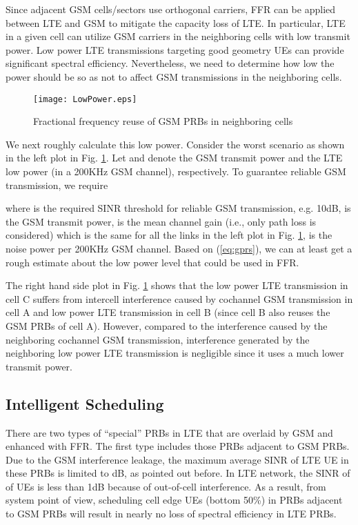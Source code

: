 \documentclass[10pt,journal]{IEEEtran}
\theoremstyle{slplain}
\begin{document}
Since adjacent GSM cells/sectors use orthogonal carriers, FFR can be applied between LTE and GSM to mitigate the capacity loss of LTE. In particular, LTE in a given cell can utilize  GSM carriers in the neighboring cells with low transmit power. Low power LTE transmissions targeting good geometry UEs can provide significant spectral efficiency. Nevertheless, we need to determine how low the power should be so as not to affect  GSM transmissions in the neighboring cells.


\begin{figure}
\centering
\texttt{[image: LowPower.eps]}
\caption{Fractional frequency reuse of GSM PRBs in neighboring cells}
\label{fig:lowPower}
\end{figure}
We next roughly calculate this low power. Consider the worst scenario as shown in the left plot in Fig. \ref{fig:lowPower}. Let  and  denote the GSM transmit power and the LTE low power (in a 200KHz GSM channel),
respectively. To guarantee reliable GSM transmission, we require

where  is the required SINR threshold for reliable GSM transmission, e.g. 10dB,  is the GSM transmit power,  is the mean channel gain (i.e., only path loss is considered) which is the same for all the  links in the left plot in Fig. \ref{fig:lowPower},  is the noise power per 200KHz GSM channel.
Based on (\ref{eq:gprs}), we can at least get a rough estimate about the low power level that could be used in FFR.

The right hand side plot in Fig. \ref{fig:lowPower} shows that the low power LTE transmission in cell C suffers from intercell interference caused by cochannel GSM transmission in cell A and low power LTE transmission in cell B (since cell B also reuses the GSM PRBs of cell A).
However, compared to the interference caused by the neighboring cochannel GSM transmission, interference generated by the neighboring low power LTE transmission is negligible since it uses a much lower transmit power.

\subsection{Intelligent Scheduling}

There are two types of ``special'' PRBs in LTE that are overlaid by GSM and enhanced with FFR. The first type includes those PRBs adjacent to GSM PRBs. Due to the GSM interference leakage, the maximum average SINR of LTE UE in these PRBs is limited to dB, as pointed out before. In LTE network, the SINR of  of UEs is less than 1dB because of out-of-cell interference. As a result, from system point of view, scheduling cell edge UEs (bottom 50\%) in PRBs adjacent to GSM PRBs will result in nearly no loss of spectral efficiency in LTE PRBs.
\end{document}
